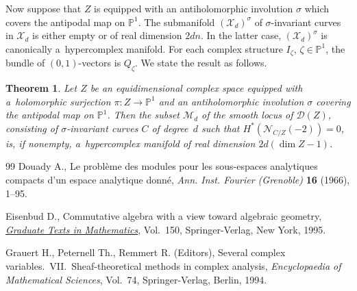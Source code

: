 \documentclass[11pt]{article}
\numberwithin{equation}{section}
\newtheorem{Theorem}{Theorem}[section]
\begin{document}
Now suppose that $Z$ is equipped with an antiholomorphic involution $\sigma$ which covers the antipodal map on
${\mathbb{P}}^1$.
The submanifold $({\mathcal{X}}_d)^\sigma$ of $\sigma$-invariant curves in ${\mathcal{X}}_d$ is either empty or of real
dimension $2dn$.
In the latter case, $({\mathcal{X}}_d)^\sigma$ is canonically a~hypercomplex manifold.
For each complex structure $I_\zeta$, $\zeta\in {\mathbb{P}}^1$, the bundle of $(0,1)$-vectors is $Q_\zeta$.
We state the result as follows.
\begin{Theorem}\label{hc}
Let $Z$ be an equidimensional complex space equipped with a~holomorphic surjection $\pi:Z\to {\mathbb{P}}^1$ and an
antiholomorphic involution $\sigma$ covering the antipodal map on ${\mathbb{P}}^1$.
Then the subset ${\mathcal{M}}_d$ of the smooth locus of ${\mathcal{D}}(Z)$, consisting of $\sigma$-invariant curves $C$
of degree~$d$ such that $H^\ast({\mathcal{N}}_{C/Z}(-2))=0$, is, if nonempty, a~hypercomplex manifold of real dimension
$2d(\dim Z -1)$.
\end{Theorem}
\begin{thebibliography}{99}
Douady A., Le probl\`eme des modules pour les sous-espaces analytiques compacts
  d'un espace analytique donn\'e, \textit{Ann. Inst. Fourier (Grenoble)}
  \textbf{16} (1966), 1--95.

Eisenbud D., Commutative algebra with a view toward algebraic geometry,
  \href{http://dx.doi.org/10.1007/978-1-4612-5350-1}{\textit{Graduate Texts in Mathematics}}, Vol.~150, Springer-Verlag, New York,
  1995.

Grauert H., Peternell Th., Remmert R. (Editors), Several complex
  variables.~{VII}.~Sheaf-theoretical methods in complex analysis,
  \textit{Encyclopaedia of Mathematical Sciences}, Vol.~74, Springer-Verlag,
  Berlin, 1994.

\end{thebibliography}
\end{document}

